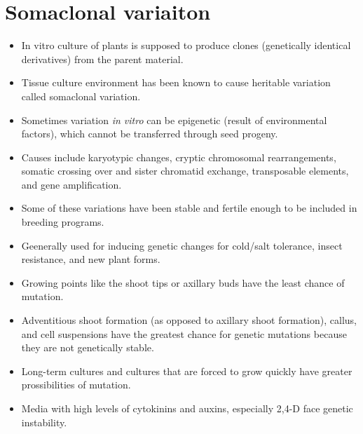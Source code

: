 \documentclass[
  ignorenonframetext,
  aspectratio=169]{beamer}
\providecommand{\tightlist}{%
  \setlength{\itemsep}{0pt}\setlength{\parskip}{0pt}}
\begin{document}
\hypertarget{somaclonal-variaiton}{%
\section{Somaclonal variaiton}\label{somaclonal-variaiton}}

\begin{frame}{}
\protect\hypertarget{section-18}{}
\begin{itemize}
\tightlist
\item
  In vitro culture of plants is supposed to produce clones (genetically
  identical derivatives) from the parent material.
\item
  Tissue culture environment has been known to cause heritable variation
  called somaclonal variation.
\item
  Sometimes variation \emph{in vitro} can be epigenetic (result of
  environmental factors), which cannot be transferred through seed
  progeny.
\item
  Causes include karyotypic changes, cryptic chromosomal rearrangements,
  somatic crossing over and sister chromatid exchange, transposable
  elements, and gene amplification.
\item
  Some of these variations have been stable and fertile enough to be
  included in breeding programs.
\item
  Geenerally used for inducing genetic changes for cold/salt tolerance,
  insect resistance, and new plant forms.
\end{itemize}
\end{frame}

\begin{frame}{}
\protect\hypertarget{section-19}{}
\begin{itemize}
\tightlist
\item
  Growing points like the shoot tips or axillary buds have the least
  chance of mutation.
\item
  Adventitious shoot formation (as opposed to axillary shoot formation),
  callus, and cell suspensions have the greatest chance for genetic
  mutations because they are not genetically stable.
\item
  Long-term cultures and cultures that are forced to grow quickly have
  greater prossibilities of mutation.
\item
  Media with high levels of cytokinins and auxins, especially 2,4-D face
  genetic instability.
\end{itemize}
\end{frame}
\end{document}
